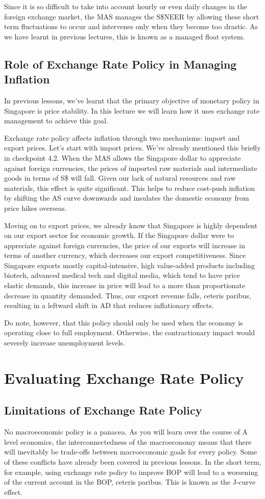Since it is so difficult to take into account hourly or even daily changes in the foreign exchange market, the MAS manages the S\$NEER by allowing these short term fluctuations to occur and intervenes only when they become too drastic. As we have learnt in previous lectures, this is known as a managed float system. 
\subsection{Role of Exchange Rate Policy in Managing Inflation}
In previous lessons, we've learnt that the primary objective of monetary policy in Singapore is price stability. In this lecture we will learn how it uses exchange rate management to achieve this goal.

Exchange rate policy affects inflation through two mechanisms: import and export prices. Let's start with import prices. We've already mentioned this briefly in checkpoint 4.2. When the MAS allows the Singapore dollar to appreciate against foreign currencies, the prices of imported raw materials and intermediate goods in terms of S\$ will fall. Given our lack of natural resources and raw materials, this effect is quite significant. This helps to reduce cost-push inflation by shifting the AS curve downwards and insulates the domestic economy from price hikes overseas.

Moving on to export prices, we already know that Singapore is highly dependent on our export sector for economic growth. If the Singapore dollar were to appreciate against foreign currencies, the price of our exports will increase in terms of another currency, which decreases our export competitiveness. Since Singapore exports mostly capital-intensive, high value-added products including biotech, advanced medical tech and digital media, which tend to have price elastic demands, this increase in price will lead to a more than proportionate decrease in quantity demanded. Thus, our export revenue falls, ceteris paribus, resulting in a leftward shift in AD that reduces inflationary effects.

Do note, however, that this policy should only be used when the economy is operating close to full employment. Otherwise, the contractionary impact would severely increase unemployment levels.
\section{Evaluating Exchange Rate Policy}
\subsection{Limitations of Exchange Rate Policy}
No macroeconomic policy is a panacea. As you will learn over the course of A level economics, the interconnectedness of the macroeconomy means that there will inevitably be trade-offs between macroeconomic goals for every policy. Some of these conflicts have already been covered in previous lessons. In the short term, for example, using exchange rate policy to improve BOP will lead to a worsening of the current account in the BOP, ceteris paribus. This is known as the J-curve effect.

